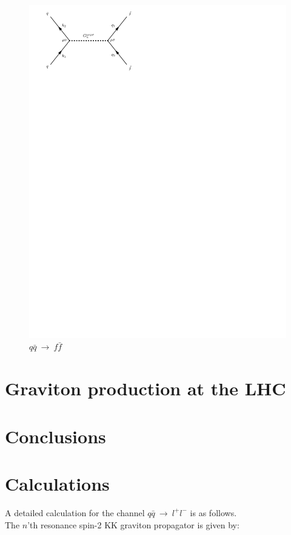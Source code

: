 \documentclass[11pt,a4paper]{article}
\begin{document}
\begin{figure}[H]
	\centering
	\includegraphics[trim={0.5cm 22cm 11.5cm 0cm},scale=1]{feynGraphs/qqbar_G_ffbar}
	\caption{$q\bar{q}\:\rightarrow\:f\bar{f}$}
	\label{fig:gravitonChannel}
\end{figure}

\section{Graviton production at the LHC}



\section{Conclusions}

\appendix
\section{Calculations}
A detailed calculation for the channel $q\bar{q}\:\rightarrow\:l^+l^-$ is as follows.\\
The $n$'th resonance spin-2 KK graviton propagator is given by:
\end{document}
